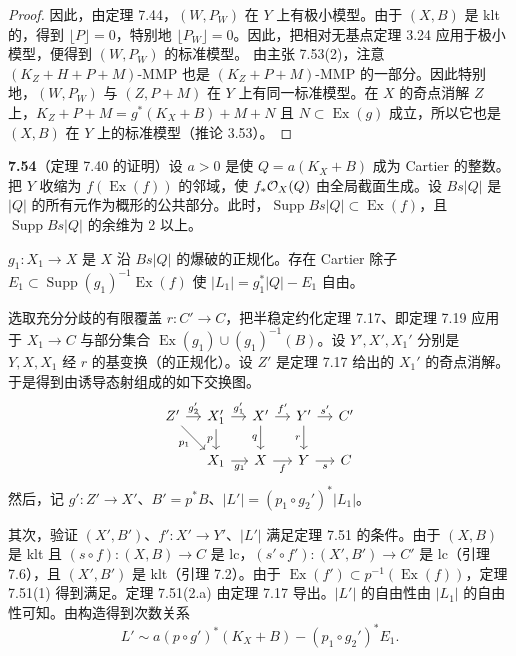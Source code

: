 \begin{proof}
因此，由定理 7.44，$(W,P_W)$ 在 $Y$ 上有极小模型。由于 $(X,B)$ 是 klt 的，得到 $\lfloor P\rfloor=0$，特别地 $\lfloor P_W\rfloor=0$。因此，把相对无基点定理 3.24 应用于极小模型，便得到 $(W,P_W)$ 的标准模型。
由主张 7.53(2)，注意 $(K_Z+H+P+M)$-MMP 也是 $(K_Z+P+M)$-MMP 的一部分。因此特别地，$(W,P_W)$ 与 $(Z,P+M)$ 在 $Y$ 上有同一标准模型。在 $X$ 的奇点消解 $Z$ 上，$K_Z+P+M=g^*(K_X+B)+M+N$ 且 $N\subset\operatorname{Ex}(g)$ 成立，所以它也是 $(X,B)$ 在 $Y$ 上的标准模型（推论 3.53）。

\end{proof}

\par\medskip\noindent\textbf{7.54}（定理 7.40 的证明）\quad 设 $a>0$ 是使 $Q=a(K_X+B)$ 成为 Cartier 的整数。把 $Y$ 收缩为 $f(\operatorname{Ex}(f))$ 的邻域，使 $f_*\mathcal{O}_X(Q)$ 由全局截面生成。设 $Bs|Q|$ 是 $|Q|$ 的所有元作为概形的公共部分。此时，$\operatorname{Supp}Bs|Q|\subset\operatorname{Ex}(f)$，且 $\operatorname{Supp}Bs|Q|$ 的余维为 2 以上。

$g_1\colon X_1\to X$ 是 $X$ 沿 $Bs|Q|$ 的爆破的正规化。存在 Cartier 除子 $E_1\subset\operatorname{Supp}(g_1)^{-1}\operatorname{Ex}(f)$ 使 $|L_1|=g_1^*|Q|-E_1$ 自由。

选取充分分歧的有限覆盖 $r\colon C'\to C$，把半稳定约化定理 7.17、即定理 7.19 应用于 $X_1\to C$ 与部分集合 $\operatorname{Ex}(g_1)\cup(g_1)^{-1}(B)$。设 $Y',X',X_1'$ 分别是 $Y,X,X_1$ 经 $r$ 的基变换（的正规化）。设 $Z'$ 是定理 7.17 给出的 $X_1'$ 的奇点消解。于是得到由诱导态射组成的如下交换图。
\[
\begin{tikzcd}[column sep=1.1em,row sep=1.5em]
Z' \arrow[r,"g_2'"] \arrow[dr,"p_1"'] & X_1' \arrow[r,"g_1'"] \arrow[d,"p"'] & X' \arrow[r,"f'"] \arrow[d,"q"'] & Y' \arrow[r,"s'"] \arrow[d,"r"'] & C'\\
& X_1 \arrow[r,"g_1"'] & X \arrow[r,"f"'] & Y \arrow[r,"s"'] & C
\end{tikzcd}
\]
然后，记 $g'\colon Z'\to X'$、$B'=p^*B$、$|L'|=(p_1\circ g_2')^*|L_1|$。

其次，验证 $(X',B')$、$f'\colon X'\to Y'$、$|L'|$ 满足定理 7.51 的条件。由于 $(X,B)$ 是 klt 且 $(s\circ f)\colon(X,B)\to C$ 是 lc，$(s'\circ f')\colon(X',B')\to C'$ 是 lc（引理 7.6），且 $(X',B')$ 是 klt（引理 7.2）。由于 $\operatorname{Ex}(f')\subset p^{-1}(\operatorname{Ex}(f))$，定理 7.51(1) 得到满足。定理 7.51(2.a) 由定理 7.17 导出。$|L'|$ 的自由性由 $|L_1|$ 的自由性可知。由构造得到次数关系
\[
L'\sim a(p\circ g')^*(K_X+B)-(p_1\circ g_2')^*E_1.
\]

